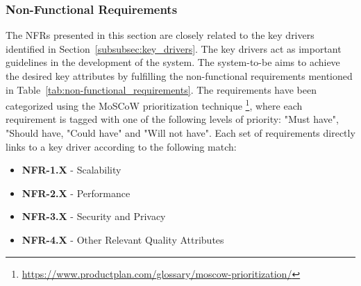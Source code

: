 \subsubsection{Non-Functional Requirements}

The \glspl{NFR} presented in this section are closely related to the key drivers identified in Section~\ref{subsubsec:key_drivers}. The key drivers act as important guidelines in the development of the system. The system-to-be aims to achieve the desired key attributes by fulfilling the non-functional requirements mentioned in Table~\ref{tab:non-functional_requirements}. The requirements have been categorized using the MoSCoW prioritization technique \footnote{\url{https://www.productplan.com/glossary/moscow-prioritization/}}, where each requirement is tagged with one of the following levels of priority: "Must have", "Should have, "Could have" and "Will not have". 
Each set of requirements directly links to a key driver according to the following match: 

\begin{itemize}
    \item \textbf{NFR-1.X} - Scalability
    \item \textbf{NFR-2.X} - Performance
    \item \textbf{NFR-3.X} - Security and Privacy
    \item \textbf{NFR-4.X} - Other Relevant Quality Attributes
\end{itemize}

